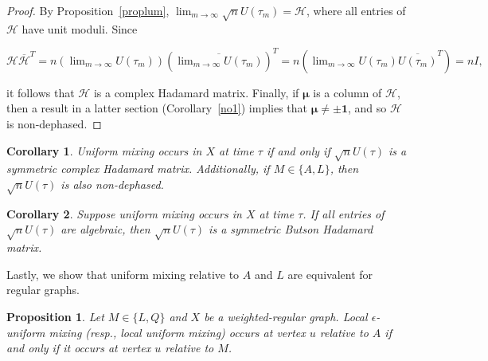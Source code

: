 \documentclass[11pt]{article}
\newtheorem{corollary}{Corollary}
\newtheorem{proposition}{Proposition}
\newcommand{\bmu}{{\boldsymbol{\mu}}}
\newcommand{\one}{\mathbf 1}
\begin{document}
\begin{proof}
By Proposition~\ref{proplum}, $\displaystyle\lim_{m\rightarrow\infty}\sqrt{n}U(\tau_m)=\mathcal{H}$, where all entries of $\mathcal{H}$ have unit moduli. Since
\begin{center}
$\displaystyle\mathcal{H}\overline{\mathcal{H}}^T=n\left(\lim_{m\rightarrow\infty}U(\tau_m)\right)\left(\overline{\lim_{m\rightarrow\infty}U(\tau_m)}\right)^T=n\left(\lim_{m\rightarrow\infty}U(\tau_m)\overline{U(\tau_m)}^T\right)=nI,$
\end{center}
it follows that $\mathcal{H}$ is a complex Hadamard matrix. Finally, if $\bmu$ is a column of $\mathcal{H}$, then a result in a latter section (Corollary~\ref{no1}) implies that $\bmu\neq \pm\one$, and so $\mathcal{H}$ is non-dephased.
\end{proof}

\begin{corollary}
\label{Lem:compHad1}
Uniform mixing occurs in $X$ at time $\tau$ if and only if  $\sqrt{n}U(\tau)$
is a symmetric complex Hadamard matrix. Additionally, if $M\in\{A,L\}$, then $\sqrt{n}U(\tau)$ is also non-dephased.
\end{corollary}

\begin{corollary}
\label{Lem:compHad1}
Suppose uniform mixing occurs in $X$ at time $\tau$. If all entries of $\sqrt{n}U(\tau)$ are algebraic, then $\sqrt{n}U(\tau)$ is a symmetric Butson Hadamard matrix.
\end{corollary}

Lastly, we show that uniform mixing relative to $A$ and $L$ are equivalent for regular graphs.

\begin{proposition}
Let $M\in\{L,Q\}$ and $X$ be a weighted-regular graph. Local $\epsilon$-uniform mixing (resp., local uniform mixing) occurs at vertex $u$ relative to $A$ if and only if it occurs at vertex $u$ relative to $M$. 
\end{proposition}
\end{document}
